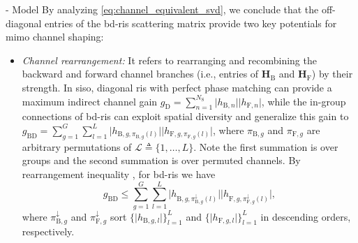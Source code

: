 \documentclass[journal]{IEEEtran}
\newtheorem{remark}{Remark}
\begin{document}
\begin{section}{- Model}
	By analyzing \eqref{eq:channel_equivalent_svd}, we conclude that the off-diagonal entries of the \gls{bd}-\gls{ris} scattering matrix provide two key potentials for \gls{mimo} channel shaping:
	\begin{itemize}
		\item \emph{Channel rearrangement:} It refers to rearranging and recombining the backward and forward channel branches (i.e., entries of $\mathbf{H}_\mathrm{B}$ and $\mathbf{H}_\mathrm{F}$)
		by their strength.
		In \gls{siso}, diagonal \gls{ris} with perfect phase matching can provide a maximum indirect channel gain $g_\mathrm{D}=\sum_{n=1}^{N_\mathrm{S}} \lvert h_{\mathrm{B},n} \rvert \lvert h_{\mathrm{F},n} \rvert$,
		while the in-group connections of
		\gls{bd}-\gls{ris} can exploit spatial diversity and generalize this gain to
		$g_\mathrm{BD}=\sum_{g=1}^{G} \sum_{l=1}^{L} \lvert h_{\mathrm{B},g,\pi_{\mathrm{B},g}(l)} \rvert \lvert h_{\mathrm{F},g,\pi_{\mathrm{F},g}(l)} \rvert$,
		where $\pi_{\mathrm{B},g}$ and $\pi_{\mathrm{F},g}$ are arbitrary permutations of $\mathcal{L} \triangleq \{1, \ldots, L\}$.
		Note the first summation is over groups and the second summation is over permuted channels.
		By rearrangement inequality \cite[Inequality 10.2.1]{Hardy1952}, for \gls{bd}-\gls{ris} we have
		\begin{equation}
			g_\mathrm{BD} \le \sum_{g=1}^{G} \sum_{l=1}^{L} \lvert h_{\mathrm{B},g,\pi^\downarrow_{\mathrm{B},g}(l)} \rvert \lvert h_{\mathrm{F},g,\pi^\downarrow_{\mathrm{F},g}(l)} \rvert,
		\end{equation}
		where $\pi^\downarrow_{\mathrm{B},g}$ and $\pi^\downarrow_{\mathrm{F},g}$ sort $\{\lvert h_{\mathrm{B},g,l} \rvert\}_{l=1}^L$ and $\{\lvert h_{\mathrm{F},g,l} \rvert\}_{l=1}^L$ in descending orders, respectively.

\end{itemize}
\end{section}
\end{document}
